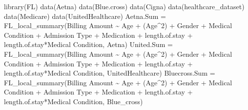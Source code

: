 \documentclass[
]{article}
\newenvironment{Shaded}{\begin{snugshade}}{\end{snugshade}}
\newcommand{\AttributeTok}[1]{\textcolor[rgb]{0.77,0.63,0.00}{#1}}
\newcommand{\DecValTok}[1]{\textcolor[rgb]{0.00,0.00,0.81}{#1}}
\newcommand{\FunctionTok}[1]{\textcolor[rgb]{0.00,0.00,0.00}{#1}}
\newcommand{\NormalTok}[1]{#1}
\newcommand{\OtherTok}[1]{\textcolor[rgb]{0.56,0.35,0.01}{#1}}
\newcommand{\SpecialCharTok}[1]{\textcolor[rgb]{0.00,0.00,0.00}{#1}}
\newcommand{\StringTok}[1]{\textcolor[rgb]{0.31,0.60,0.02}{#1}}
\begin{document}
\begin{Shaded}
\begin{Highlighting}[]
\FunctionTok{library}\NormalTok{(FL)}
\FunctionTok{data}\NormalTok{(Aetna)}
\FunctionTok{data}\NormalTok{(Blue.cross)}
\FunctionTok{data}\NormalTok{(Cigna)}
\FunctionTok{data}\NormalTok{(healthcare\_dataset)}
\FunctionTok{data}\NormalTok{(Medicare)}
\FunctionTok{data}\NormalTok{(UnitedHealthcare)}
\NormalTok{Aetna.Sum }\OtherTok{=} \FunctionTok{FL\_local\_summary}\NormalTok{(}\StringTok{\textasciigrave{}}\AttributeTok{Billing Amount}\StringTok{\textasciigrave{}} \SpecialCharTok{\textasciitilde{}}\NormalTok{ Age }\SpecialCharTok{+}\NormalTok{ (Age}\SpecialCharTok{\^{}}\DecValTok{2}\NormalTok{) }\SpecialCharTok{+}\NormalTok{ Gender }\SpecialCharTok{+} \StringTok{\textasciigrave{}}\AttributeTok{Medical Condition}\StringTok{\textasciigrave{}} \SpecialCharTok{+} \StringTok{\textasciigrave{}}\AttributeTok{Admission Type}\StringTok{\textasciigrave{}} \SpecialCharTok{+}\NormalTok{ Medication }\SpecialCharTok{+}\NormalTok{ length.of.stay }\SpecialCharTok{+}\NormalTok{ length.of.stay}\SpecialCharTok{*}\StringTok{\textasciigrave{}}\AttributeTok{Medical Condition}\StringTok{\textasciigrave{}}\NormalTok{, Aetna)}
\NormalTok{United.Sum }\OtherTok{=} \FunctionTok{FL\_local\_summary}\NormalTok{(}\StringTok{\textasciigrave{}}\AttributeTok{Billing Amount}\StringTok{\textasciigrave{}} \SpecialCharTok{\textasciitilde{}}\NormalTok{ Age }\SpecialCharTok{+}\NormalTok{ (Age}\SpecialCharTok{\^{}}\DecValTok{2}\NormalTok{) }\SpecialCharTok{+}\NormalTok{ Gender }\SpecialCharTok{+} \StringTok{\textasciigrave{}}\AttributeTok{Medical Condition}\StringTok{\textasciigrave{}} \SpecialCharTok{+} \StringTok{\textasciigrave{}}\AttributeTok{Admission Type}\StringTok{\textasciigrave{}} \SpecialCharTok{+}\NormalTok{ Medication }\SpecialCharTok{+}\NormalTok{ length.of.stay }\SpecialCharTok{+}\NormalTok{ length.of.stay}\SpecialCharTok{*}\StringTok{\textasciigrave{}}\AttributeTok{Medical Condition}\StringTok{\textasciigrave{}}\NormalTok{, UnitedHealthcare)}
\NormalTok{Bluecross.Sum }\OtherTok{=} \FunctionTok{FL\_local\_summary}\NormalTok{(}\StringTok{\textasciigrave{}}\AttributeTok{Billing Amount}\StringTok{\textasciigrave{}} \SpecialCharTok{\textasciitilde{}}\NormalTok{ Age }\SpecialCharTok{+}\NormalTok{ (Age}\SpecialCharTok{\^{}}\DecValTok{2}\NormalTok{) }\SpecialCharTok{+}\NormalTok{ Gender }\SpecialCharTok{+} \StringTok{\textasciigrave{}}\AttributeTok{Medical Condition}\StringTok{\textasciigrave{}} \SpecialCharTok{+} \StringTok{\textasciigrave{}}\AttributeTok{Admission Type}\StringTok{\textasciigrave{}} \SpecialCharTok{+}\NormalTok{ Medication }\SpecialCharTok{+}\NormalTok{ length.of.stay }\SpecialCharTok{+}\NormalTok{ length.of.stay}\SpecialCharTok{*}\StringTok{\textasciigrave{}}\AttributeTok{Medical Condition}\StringTok{\textasciigrave{}}\NormalTok{, Blue\_cross)}

\end{Highlighting}
\end{Shaded}
\end{document}
